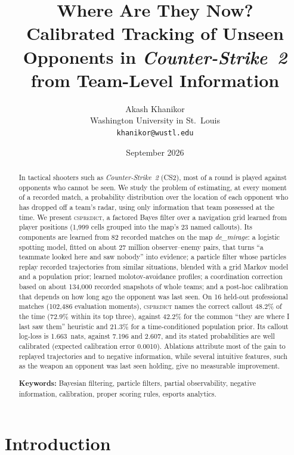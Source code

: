 \documentclass[11pt]{article}
\title{\textbf{Where Are They Now?}\\[4pt]
\Large Calibrated Tracking of Unseen Opponents in \emph{Counter-Strike~2}\\ from Team-Level Information}
\author{Akash Khanikor\\[2pt]
\normalsize Washington University in St.\ Louis\\
\normalsize\texttt{khanikor@wustl.edu}}
\date{September 2026}
\newcommand{\cs}{\textsc{cspredict}}
\newcommand{\1}{\mathbb{1}}
\begin{document}
\maketitle

\begin{abstract}
\noindent In tactical shooters such as \emph{Counter-Strike~2} (CS2), most of a round is played against opponents who cannot be seen. We study the problem of estimating, at every moment of a recorded match, a probability distribution over the location of each opponent who has dropped off a team's radar, using only information that team possessed at the time. We present \cs, a factored Bayes filter over a navigation grid learned from player positions (1{,}999 cells grouped into the map's 23 named callouts). Its components are learned from 82 recorded matches on the map \emph{de\_mirage}: a logistic spotting model, fitted on about 27 million observer--enemy pairs, that turns ``a teammate looked here and saw nobody'' into evidence; a particle filter whose particles replay recorded trajectories from similar situations, blended with a grid Markov model and a population prior; learned molotov-avoidance profiles; a coordination correction based on about 134{,}000 recorded snapshots of whole teams; and a post-hoc calibration that depends on how long ago the opponent was last seen. On 16 held-out professional matches (102{,}486 evaluation moments), \cs{} names the correct callout 48.2\% of the time (72.9\% within its top three), against 42.2\% for the common ``they are where I last saw them'' heuristic and 21.3\% for a time-conditioned population prior. Its callout log-loss is 1.663~nats, against 7.196 and 2.607, and its stated probabilities are well calibrated (expected calibration error 0.0010). Ablations attribute most of the gain to replayed trajectories and to negative information, while several intuitive features, such as the weapon an opponent was last seen holding, give no measurable improvement.

\medskip
\noindent\textbf{Keywords:} Bayesian filtering, particle filters, partial observability, negative information, calibration, proper scoring rules, esports analytics.
\end{abstract}

\section{Introduction}
\label{sec:intro}
\end{document}
